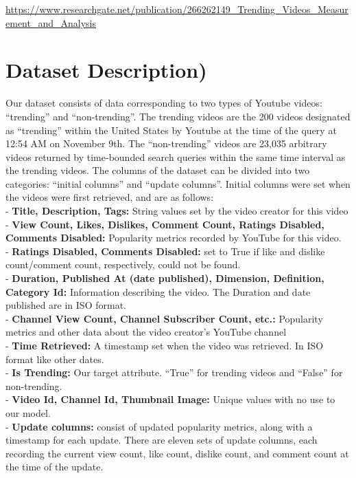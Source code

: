 \documentclass{article}
\begin{document}
\href{https://www.researchgate.net/publication/266262149_Trending_Videos_Measurement_and_Analysis}{https://www.researchgate.net/publication/266262149\_Trending\_Videos\_Measurement\_and\_Analysis} 

\section*{Dataset Description)}

\noindent
\quad Our dataset consists of data corresponding to two types of Youtube videos: “trending” and “non-trending”. The trending videos are the 200 videos designated as “trending” within the United States by Youtube at the time of the query at 12:54 AM on November 9th. The “non-trending” videos are 23,035 arbitrary videos returned by time-bounded search queries within the same time interval as the trending videos. The columns of the dataset can be divided into two categories: “initial columns” and “update columns”. Initial columns were set when the videos were first retrieved, and are as follows: \\

\noindent
- \textbf{Title, Description, Tags:} String values set by the video creator for this video \\
- \textbf{View Count, Likes, Dislikes, Comment Count, Ratings Disabled, Comments Disabled:} Popularity metrics recorded by YouTube for this video. \\
- \textbf{Ratings Disabled, Comments Disabled:} set to True if like and dislike count/comment count, respectively, could not be found. \\
- \textbf{Duration, Published At (date published), Dimension, Definition, Category Id:} Information describing the video. The Duration and date published are in ISO format. \\
- \textbf{Channel View Count, Channel Subscriber Count, etc.:} Popularity metrics and other data about the video creator’s YouTube channel \\
- \textbf{Time Retrieved:} A timestamp set when the video was retrieved. In ISO format like other dates. \\
- \textbf{Is Trending:} Our target attribute. “True” for trending videos and “False” for non-trending. \\
- \textbf{Video Id, Channel Id, Thumbnail Image:} Unique values with no use to our model. \\
- \textbf{Update columns:} consist of updated popularity metrics, along with a timestamp for each update. There are eleven sets of update columns, each recording the current view count, like count, dislike count, and comment count at the time of the update. \\
\end{document}
